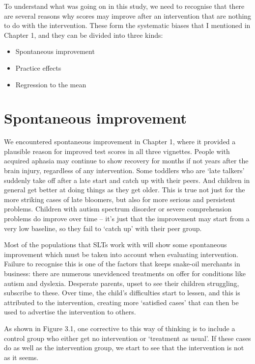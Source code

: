 \documentclass[]{book}
\providecommand{\tightlist}{%
  \setlength{\itemsep}{0pt}\setlength{\parskip}{0pt}}
\begin{document}
To understand what was going on in this study, we need to recognise that there are several reasons why scores may improve after an intervention that are nothing to do with the intervention. These form the systematic biases that I mentioned in Chapter 1, and they can be divided into three kinds:

\begin{itemize}
\tightlist
\item
  Spontaneous improvement
\item
  Practice effects
\item
  Regression to the mean
\end{itemize}

\hypertarget{spontaneous-improvement}{%
\section{Spontaneous improvement}\label{spontaneous-improvement}}

We encountered spontaneous improvement in Chapter 1, where it provided a plausible reason for improved test scores in all three vignettes. People with acquired aphasia may continue to show recovery for months if not years after the brain injury, regardless of any intervention. Some toddlers who are `late talkers' suddenly take off after a late start and catch up with their peers. And children in general get better at doing things as they get older. This is true not just for the more striking cases of late bloomers, but also for more serious and persistent problems. Children with autism spectrum disorder or severe comprehension problems do improve over time -- it's just that the improvement may start from a very low baseline, so they fail to `catch up' with their peer group.

Most of the populations that SLTs work with will show some spontaneous improvement which must be taken into account when evaluating intervention. Failure to recognise this is one of the factors that keeps snake-oil merchants in business: there are numerous unevidenced treatments on offer for conditions like autism and dyslexia. Desperate parents, upset to see their children struggling, subscribe to these. Over time, the child's difficulties start to lessen, and this is attributed to the intervention, creating more `satisfied cases' that can then be used to advertise the intervention to others.

As shown in Figure 3.1, one corrective to this way of thinking is to include a control group who either get no intervention or `treatment as usual'. If these cases do as well as the intervention group, we start to see that the intervention is not as it seems.
\end{document}
